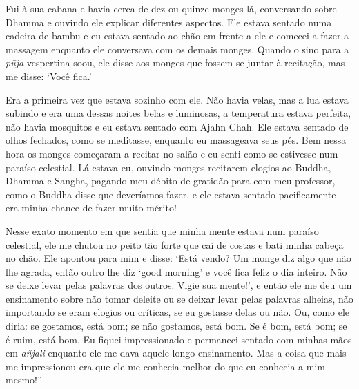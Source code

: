 Fui à sua cabana e havia cerca de dez ou quinze monges lá, conversando
sobre Dhamma e ouvindo ele explicar diferentes aspectos. Ele estava
sentado numa cadeira de bambu e eu estava sentado ao chão em frente a
ele e comecei a fazer a massagem enquanto ele conversava com os demais
monges. Quando o sino para a \emph{pūja} vespertina soou, ele disse aos
monges que fossem se juntar à recitação, mas me disse: `Você fica.'

Era a primeira vez que estava sozinho com ele. Não havia velas, mas a
lua estava subindo e era uma dessas noites belas e luminosas, a
temperatura estava perfeita, não havia mosquitos e eu estava sentado com
Ajahn Chah. Ele estava sentado de olhos fechados, como se meditasse,
enquanto eu massageava seus pés. Bem nessa hora os monges começaram a
recitar no salão e eu senti como se estivesse num paraíso celestial. Lá
estava eu, ouvindo monges recitarem elogios ao Buddha, Dhamma e Sangha,
pagando meu débito de gratidão para com meu professor, como o Buddha
disse que deveríamos fazer, e ele estava sentado pacificamente -- era
minha chance de fazer muito mérito!

Nesse exato momento em que sentia que minha mente estava num paraíso
celestial, ele me chutou no peito tão forte que caí de costas e bati
minha cabeça no chão. Ele apontou para mim e disse: `Está vendo? Um
monge diz algo que não lhe agrada, então outro lhe diz `good morning' e
você fica feliz o dia inteiro. Não se deixe levar pelas palavras dos
outros. Vigie sua mente!', e então ele me deu um ensinamento sobre não
tomar deleite ou se deixar levar pelas palavras alheias, não importando
se eram elogios ou críticas, se eu gostasse delas ou não. Ou, como ele
diria: se gostamos, está bom; se não gostamos, está bom. Se é bom, está
bom; se é ruim, está bom. Eu fiquei impressionado e permaneci sentado
com minhas mãos em \emph{añjali} enquanto ele me dava aquele longo
ensinamento. Mas a coisa que mais me impressionou era que ele me
conhecia melhor do que eu conhecia a mim mesmo!''

